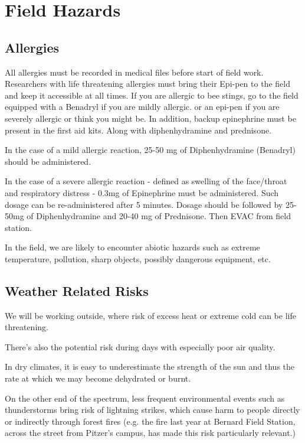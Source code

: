 \documentclass[12pt]{../SOP4_alpha}\usepackage[]{graphicx}\usepackage[]{color}
\begin{document}
\section{Field Hazards}

\subsection*{Allergies}

\NP All allergies must be recorded in medical files before start of field work. Researchers with life threatening allergies must bring their Epi-pen to the field and keep it accessible at all times. If you are allergic to bee stings, go to the field equipped with a Benadryl if you are mildly allergic.  or an epi-pen if you are severely allergic or think you might be.  In addition, backup epinephrine must be present in the first aid kits. Along with diphenhydramine and prednisone. 

\NP In the case of a mild allergic reaction, 25-50 mg of Diphenhydramine (Benadryl) should be administered. 

\NP In the case of a severe allergic reaction - defined as swelling of the face/throat and respiratory distress - 0.3mg of Epinephrine must be administered. Such dosage can be re-administered after 5 minutes. Dosage should be followed by 25-50mg of Diphenhydramine and 20-40 mg of Prednisone. Then EVAC from field station. 

\NP In the field, we are likely to encounter abiotic hazards such as extreme temperature, pollution, sharp objects, possibly dangerous equipment, etc.

\subsection*{Weather Related Risks}

\NP We will be working outside, where risk of excess heat or extreme cold can be life threatening. 

\NP There's also the potential risk during days with especially poor air quality. 

\NP In dry climates, it is easy to underestimate the strength of the sun and thus the rate at which we may become dehydrated or burnt.  

\NP On the other end of the spectrum, less frequent environmental events such as thunderstorms bring risk of lightning strikes, which cause harm to people directly or indirectly through forest fires (e.g. the fire last year at Bernard Field Station, across the street from Pitzer's campus, has made this risk particularly relevant.)
\end{document}
